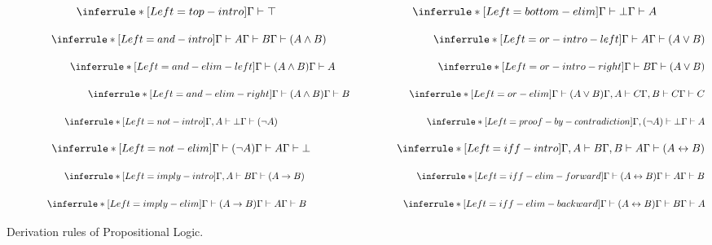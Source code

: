 \documentclass[master.tex]{subfiles}
\begin{document}
\begin{figure}[H]
\centering
\begin{framed}
$$ \qquad  \qquad  \qquad
\derivRule{top-intro}{\Gamma \vdash \top}{ } \qquad  \qquad  \qquad  \qquad \qquad  \qquad
\derivRule{bottom-elim}{\Gamma \vdash A}{\Gamma \vdash \bot}
$$

$$ \qquad \qquad
\derivRule{and-intro}{\Gamma \vdash (A \wedge B)}{\Gamma \vdash A \\ \Gamma
  \vdash B} \qquad \qquad \qquad \qquad  \qquad
\derivRule{or-intro-left}{\Gamma \vdash (A \vee B)}{\Gamma \vdash A}
$$

$$ \qquad \qquad  \qquad
\derivRule{and-elim-left}{\Gamma \vdash
  A}{\Gamma \vdash (A \wedge B)} \qquad \qquad \qquad  \qquad \qquad
\derivRule{or-intro-right}{\Gamma \vdash (A \vee B)}{\Gamma \vdash B}
$$

$$ \qquad  \qquad  \qquad  \qquad
\derivRule{and-elim-right}{\Gamma \vdash B}{\Gamma \vdash (A \wedge B)} \qquad
\qquad \qquad
\derivRule{or-elim}{\Gamma \vdash C}{\Gamma \vdash (A \vee B) \\
  \Gamma, A \vdash C \\
  \Gamma, B \vdash C}
$$

$$ \qquad \qquad \qquad
\derivRule{not-intro}{\Gamma \vdash (\neg A)}{\Gamma, A \vdash \bot}
  \qquad  \qquad  \qquad  \qquad  \qquad  \qquad  \qquad \qquad
\derivRule{proof-by-contradiction}{\Gamma \vdash A}{\Gamma, (\neg A) \vdash \bot}
$$

$$
\qquad  \qquad
\derivRule{not-elim}{\Gamma \vdash \bot}{\Gamma \vdash (\neg A) \\ \Gamma \vdash
  A}
\qquad  \qquad  \qquad \qquad
\derivRule{iff-intro}{\Gamma \vdash (A \leftrightarrow B)}{\Gamma, A \vdash B
  \\ \Gamma, B \vdash A}
$$

$$
\qquad \qquad \qquad
\derivRule{imply-intro}{\Gamma \vdash (A \rightarrow B)}{\Gamma, A \vdash B}
\qquad \qquad \qquad  \qquad \qquad  \qquad
\derivRule{iff-elim-forward}{\Gamma \vdash B}{\Gamma \vdash (A \leftrightarrow B) \\
  \Gamma \vdash A}
$$

$$ \qquad  \qquad
\derivRule{imply-elim}{\Gamma \vdash B}{\Gamma \vdash (A \rightarrow B) \\
  \Gamma \vdash A}
\qquad  \qquad  \qquad \qquad  \qquad
\derivRule{iff-elim-backward}{\Gamma \vdash A}{\Gamma \vdash (A \leftrightarrow B) \\
  \Gamma \vdash B}
$$
\end{framed}
\caption{Derivation rules of Propositional Logic.}
\end{figure}
\end{document}
